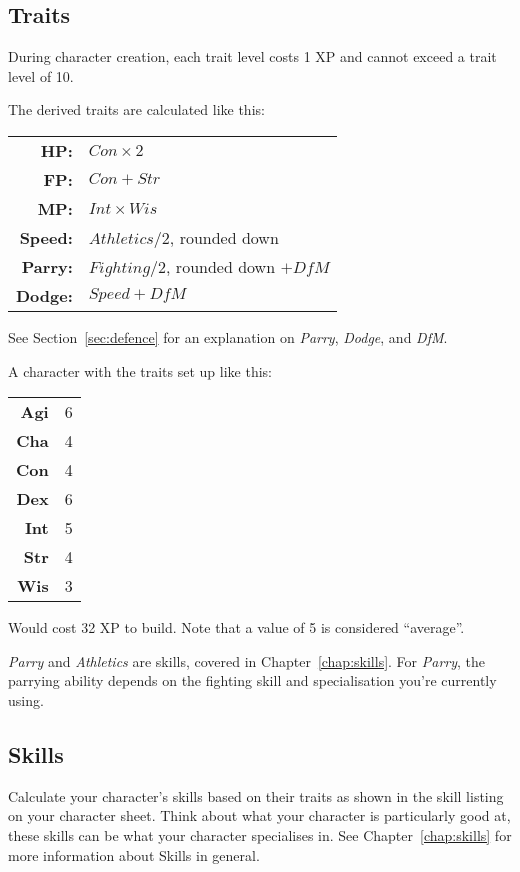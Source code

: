 \subsection{Traits}
During character creation, each trait level costs 1 XP and cannot exceed a trait level of 10.

The derived traits are calculated like this:

\begin{tabular} {r | l} 
\textbf{HP:} & $Con \times 2$ \\
\textbf{FP:} & $Con + Str$ \\
\textbf{MP:} & $Int \times Wis$ \\
\textbf{Speed:} & $Athletics / 2$, rounded down\\
\textbf{Parry:} & $Fighting / 2$, rounded down $+ \mathit{DfM}$\\
\textbf{Dodge:} & $Speed + \mathit{DfM}$ \\
\end{tabular}

See Section~\ref{sec:defence} for an explanation on \textit{Parry}, \textit{Dodge}, and \textit{DfM}.

\example A character with the traits set up like this:

\begin{tabular}{r | l}
    \textbf{Agi} & 6\\
    \textbf{Cha} & 4\\
    \textbf{Con} & 4\\
    \textbf{Dex} & 6\\
    \textbf{Int} & 5\\
    \textbf{Str} & 4\\
    \textbf{Wis} & 3\\
\end{tabular}

Would cost 32 XP to build.
Note that a value of 5 is considered ``average''.

\note \textit{Parry} and \textit{Athletics} are skills, covered in Chapter~\ref{chap:skills}.
For \textit{Parry}, the parrying ability depends on the fighting skill and specialisation you're currently using.

\subsection{Skills}
Calculate your character's skills based on their traits as shown in the skill listing on your character sheet.
Think about what your character is particularly good at, these skills can be what your character specialises in.
See Chapter~\ref{chap:skills} for more information about Skills in general.

